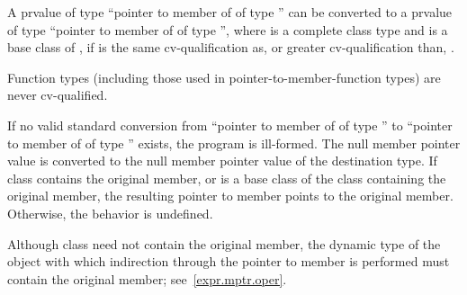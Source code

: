 \pnum
{}%
A prvalue of type ``pointer to member of  of type 
'' can be converted to a prvalue of type ``pointer to member of
 of type  '', where
 is a complete class type and
 is a base class of ,
if  is the same cv-qualification
as, or greater cv-qualification than, .
\begin{note}
Function types (including those used in pointer-to-member-function types)
are never cv-qualified.
\end{note}
If no valid standard conversion
from ``pointer to member of  of type ''
to ``pointer to member of  of type ''
exists, the program is ill-formed.
The null member pointer value is converted to the null
member pointer value of the destination type. If class 
contains the original member, or is a base class of the class
containing the original member, the resulting pointer to member points
to the original member. Otherwise, the behavior is undefined.
%
%
%
%
%
\begin{note}
Although class  need not contain the original member, the
dynamic type of the object with which indirection through the pointer
to member is performed must contain the original member;
see~\ref{expr.mptr.oper}.
\end{note}


